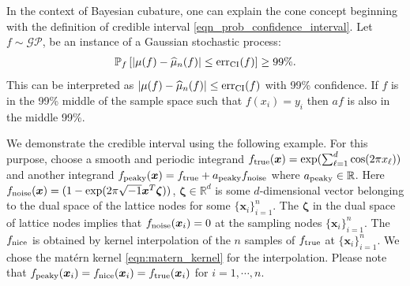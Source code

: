 \documentclass{iitthesis}          %
\newcommand{\bm}[1]{\boldsymbol{#1}}
\newcommand{\reals}{\mathbb{R}}
\newcommand{\vzeta}{{\bm{\zeta}}}
\newcommand{\vx}{\bm{x}}
\newcommand{\hmu}{\widehat{\mu}}
\newcommand{\NICE}{\textup{nice}}
\newcommand{\PEAKY}{\textup{peaky}}
\newcommand{\NOISE}{\textup{noise}}
\newcommand{\TRUE}{\textup{true}}
\newcommand{\err}{\textup{err}}
\begin{document}
In the context of Bayesian cubature, one can explain the cone concept beginning with the definition of credible interval \eqref{eqn_prob_confidence_interval}. 
Let $f \sim \mathcal{GP}$, be an instance of a Gaussian stochastic process:
\begin{align*}
\mathbb{P}_f \left[
|\mu(f)-\hmu_n(f)| \leq \err_{\textup{CI}}(f) \right] \ge 99\%.
\end{align*}
This can be interpreted as $|\mu(f)-\hmu_n(f)| \leq \err_{\textup{CI}}(f)$ with 99\% confidence. If $f$ is in the 99\% middle of the sample space such that $f(x_i) = y_i$ then $af$ is also in the middle 99\%.

We demonstrate the credible interval using the following example. For this purpose, choose a smooth and periodic integrand $f_{\TRUE}(\vx) = \exp(\sum_{\ell=1}^{d} \cos(2\pi x_\ell))$ and another integrand $f_{\PEAKY}(\vx) = f_{\TRUE} + a_{\PEAKY} f_{\NOISE}$ where $a_{\PEAKY} \in \reals$. 
Here $f_{\NOISE}(\vx) = (1 - \exp(2\pi \sqrt{-1} \vx^T \vzeta))$, $\vzeta \in \reals^d$ is some $d$-dimensional vector belonging to the dual space of the lattice nodes for some $\{ \vx_i\}_{i=1}^n$. %
The $\vzeta$ in the dual space of lattice nodes implies that $f_{\NOISE}(\vx_i)=0$ at the sampling nodes $\{ \vx_i\}_{i=1}^n$.
The $f_{\NICE}$ is obtained by kernel interpolation of the $n$ samples of $f_\TRUE$ at $\{ \vx_i\}_{i=1}^n$. We chose the mat\'ern kernel \eqref{eqn:matern_kernel} for the interpolation.
Please note that $f_{\PEAKY}(\vx_i) = f_{\NICE}(\vx_i) = f_{\TRUE}(\vx_i) $ for $i=1, \cdots, n$.
\end{document}
